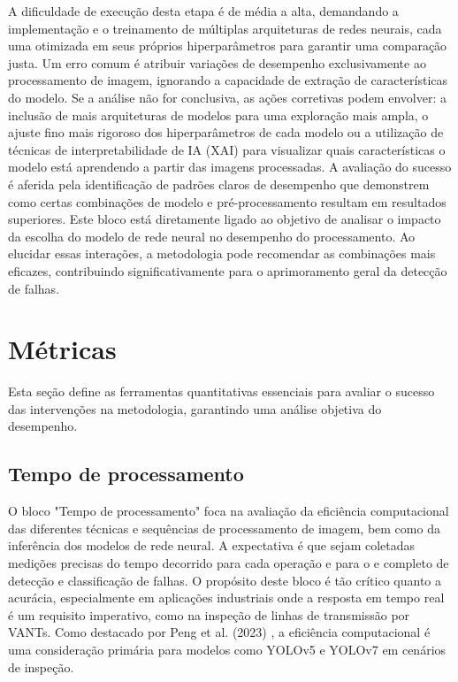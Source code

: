 A dificuldade de execução desta etapa é de média a alta, demandando a implementação e o treinamento de múltiplas arquiteturas de redes neurais, cada uma otimizada em seus próprios hiperparâmetros para garantir uma comparação justa. Um erro comum é atribuir variações de desempenho exclusivamente ao processamento de imagem, ignorando a capacidade de extração de características do modelo. Se a análise não for conclusiva, as ações corretivas podem envolver: a inclusão de mais arquiteturas de modelos para uma exploração mais ampla, o ajuste fino mais rigoroso dos hiperparâmetros de cada modelo ou a utilização de técnicas de interpretabilidade de IA (XAI) para visualizar quais características o modelo está aprendendo a partir das imagens processadas. A avaliação do sucesso é aferida pela identificação de padrões claros de desempenho que demonstrem como certas combinações de modelo e pré-processamento resultam em resultados superiores. Este bloco está diretamente ligado ao objetivo de analisar o impacto da escolha do modelo de rede neural no desempenho do processamento. Ao elucidar essas interações, a metodologia pode recomendar as combinações mais eficazes, contribuindo significativamente para o aprimoramento geral da detecção de falhas.

\section{Métricas}

Esta seção define as ferramentas quantitativas essenciais para avaliar o sucesso das intervenções na metodologia, garantindo uma análise objetiva do desempenho.

\subsection{Tempo de processamento}
O bloco "Tempo de processamento" foca na avaliação da eficiência computacional das diferentes técnicas e sequências de processamento de imagem, bem como da inferência dos modelos de rede neural. A expectativa é que sejam coletadas medições precisas do tempo decorrido para cada operação e para o e completo de detecção e classificação de falhas. O propósito deste bloco é tão crítico quanto a acurácia, especialmente em aplicações industriais onde a resposta em tempo real é um requisito imperativo, como na inspeção de linhas de transmissão por VANTs. Como destacado por Peng et al. (2023) \cite{Peng2023}, a eficiência computacional é uma consideração primária para modelos como YOLOv5 e YOLOv7 em cenários de inspeção.


